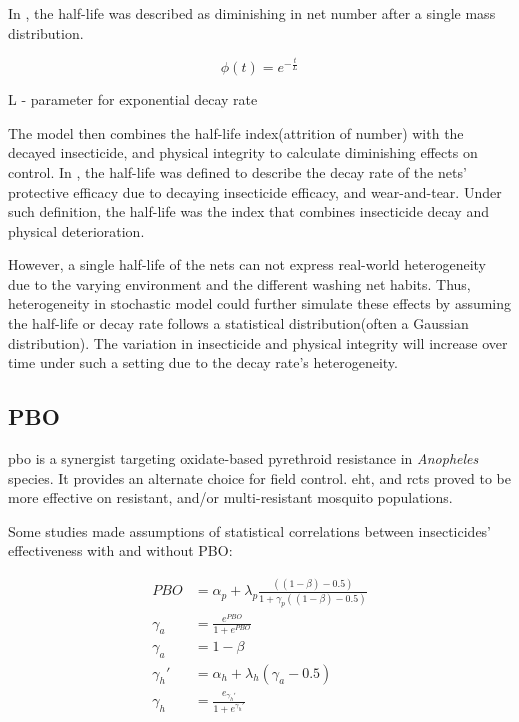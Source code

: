 \documentclass[a4paper, 12pt, twoside]{report}
\begin{document}
In \cite{Briet2013}, the half-life was described as diminishing in net number after a single mass distribution.

\begin{equation}
  \phi(t) = e^{- \frac{t}{L} }
\end{equation}
\begin{center}
  L - parameter for exponential decay rate
\end{center}

The model then combines the half-life index(attrition of number) with the decayed insecticide, and physical integrity to calculate diminishing effects on control.
In \cite{Griffin2010}, the half-life was defined to describe the decay rate of the nets' protective efficacy due to decaying insecticide efficacy, and wear-and-tear.
Under such definition, the half-life was the index that combines insecticide decay and physical deterioration.

However, a single half-life of the nets can not express real-world heterogeneity due to the varying environment and the different washing net habits.
Thus, heterogeneity in stochastic model could further simulate these effects by assuming the half-life or decay rate follows a statistical distribution(often a Gaussian distribution).
The variation in insecticide and physical integrity will increase over time under such a setting due to the decay rate's heterogeneity.

\subsection{PBO}
\gls{pbo} is a synergist targeting oxidate-based pyrethroid resistance in \textit{Anopheles} species.
It provides an alternate choice for field control.
\gls{eht}\cite{Akoton2018a}, and \gls{rct}s proved to be more effective on resistant, and/or multi-resistant mosquito populations.

Some studies made assumptions of statistical correlations between insecticides' effectiveness with and without PBO:

\begin{align}
  PBO & = \alpha_p + \lambda_p \frac{((1-\beta) - 0.5)}{1 + \gamma_p ((1-\beta) - 0.5)} \\
  \gamma_a & = \frac{e^{PBO}}{1 + e^{PBO}}\\
  \gamma_a & = 1 - \beta\\
  \gamma_h' & = \alpha_h + \lambda_h ( \gamma_a - 0.5 ) \\ 
  \gamma_h & = \frac{e_{\gamma_h'}}{1+e^{\gamma_h'}}
\end{align}
\end{document}
